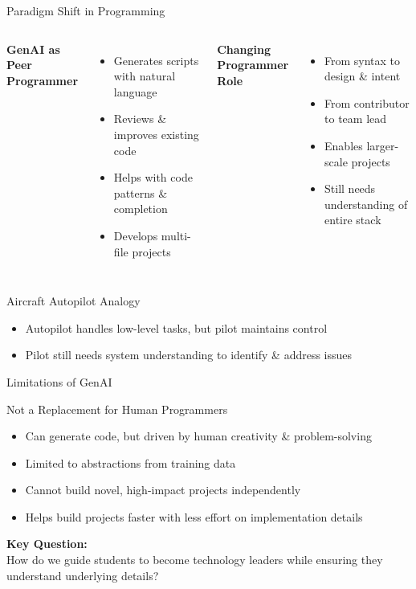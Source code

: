 \documentclass{beamer}
\begin{document}
\begin{frame}{Paradigm Shift in Programming}
    \begin{columns}
        \textbf{GenAI as Peer Programmer}
        \begin{itemize}
            \item Generates scripts with natural language
            \item Reviews \& improves existing code
            \item Helps with code patterns \& completion
            \item Develops multi-file projects
        \end{itemize}
        
        \textbf{Changing Programmer Role}
        \begin{itemize}
            \item From syntax to design \& intent
            \item From contributor to team lead
            \item Enables larger-scale projects
            \item Still needs understanding of entire stack
        \end{itemize}
    \end{columns}
    
    \begin{alertblock}{Aircraft Autopilot Analogy}
        \begin{itemize}
            \item Autopilot handles low-level tasks, but pilot maintains control
            \item Pilot still needs system understanding to identify \& address issues
        \end{itemize}
    \end{alertblock}
\end{frame}

\begin{frame}{Limitations of GenAI}
    \begin{block}{Not a Replacement for Human Programmers}
        \begin{itemize}
            \item Can generate code, but driven by human creativity \& problem-solving
            \item Limited to abstractions from training data
            \item Cannot build novel, high-impact projects independently
            \item Helps build projects faster with less effort on implementation details
        \end{itemize}
    \end{block}
    
    \begin{center}
        \large \textbf{Key Question:} \\
        How do we guide students to become technology leaders while ensuring they understand underlying details?
    \end{center}
\end{frame}
\end{document}
